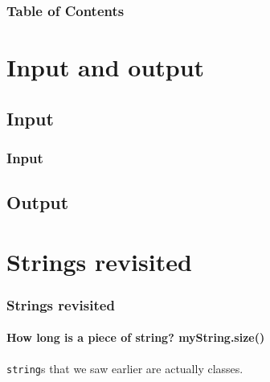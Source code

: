 \documentclass{beamer}
\subtitle{Session 4: Input/Output}
\begin{document}
\frame{\titlepage}

\begin{frame}
\frametitle{Table of Contents}
\tableofcontents
\end{frame}


\section{Input and output}

\subsection{Input}

\begin{frame}[fragile]
	\frametitle{Input}
	
	
\end{frame}

\subsection{Output}

\section{Strings revisited}

\begin{frame}[fragile]
  \frametitle{Strings revisited}
  \framesubtitle{How long is a piece of string? myString.size()}
  
  \texttt{string}s that we saw earlier are actually classes.

\end{frame}
\end{document}
